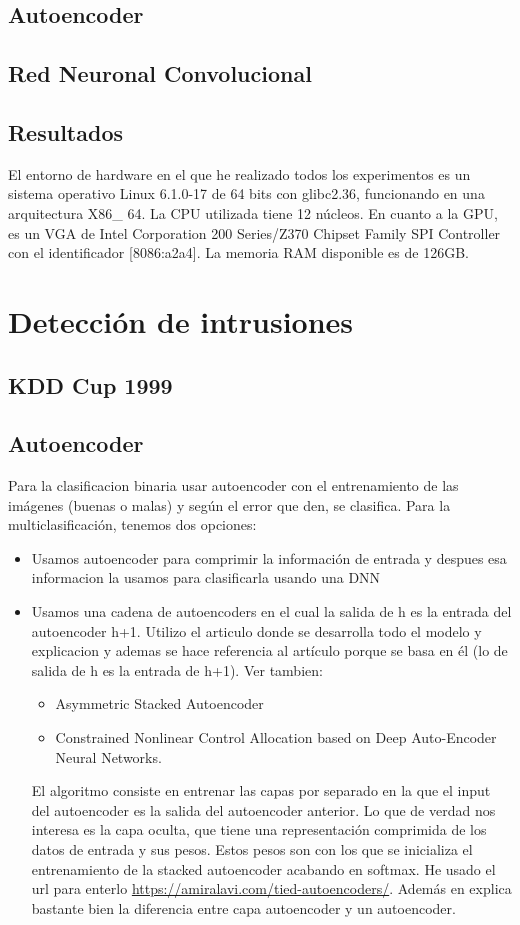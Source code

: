 \subsection{Autoencoder}
\subsection{Red Neuronal Convolucional}
\subsection{Resultados}
El entorno de hardware en el que he realizado todos los experimentos es un sistema operativo Linux 6.1.0-17 de 64 bits con glibc2.36, funcionando en una arquitectura X86\_ 64. La CPU utilizada tiene 12 núcleos. En cuanto a la GPU, es un VGA de Intel Corporation 200 Series/Z370 Chipset Family SPI Controller con el identificador [8086:a2a4]. La memoria RAM disponible es de 126GB. 


\section{Detección de intrusiones}
\subsection{KDD Cup 1999}
\subsection{Autoencoder}
Para la clasificacion binaria usar autoencoder con el entrenamiento de las imágenes (buenas o malas) y según el error que den, se clasifica.
Para la multiclasificación, tenemos dos opciones:
\begin{itemize}
\item Usamos autoencoder para comprimir la información de entrada y despues esa informacion la usamos para clasificarla usando una DNN \citep{lopes2022effective}
\item Usamos una cadena de autoencoders en el cual la salida de h es la entrada del autoencoder h+1. Utilizo el articulo \citep{farahnakian2018deep} donde se desarrolla todo el modelo y explicacion y ademas se hace referencia al artículo \citep{bengio2006greedy} porque se basa en él (lo de salida de h es la entrada de h+1). Ver tambien:
\begin{itemize}
\item Asymmetric Stacked Autoencoder
\item Constrained Nonlinear Control Allocation based on Deep Auto-Encoder Neural Networks.

\end{itemize} El algoritmo consiste en entrenar las capas por separado en la que el input del autoencoder es la salida del autoencoder anterior. Lo que de verdad nos interesa es la capa oculta, que tiene una representación comprimida de los datos de entrada y sus pesos. Estos pesos son con los que se inicializa el entrenamiento de la stacked autoencoder acabando en softmax. He usado el url para enterlo \url{https://amiralavi.com/tied-autoencoders/}. Además en \citep{bao2017deep} explica bastante bien la diferencia entre capa autoencoder y un autoencoder.
\end{itemize}
